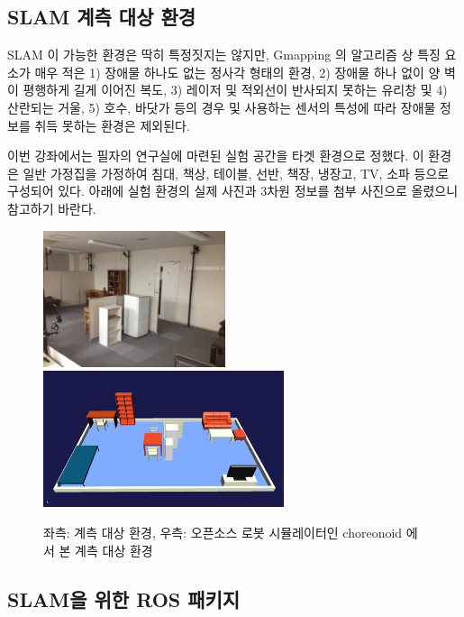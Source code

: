 \subsection{SLAM 계측 대상 환경}
\label{subsubsec:kobuki_target_environment}

SLAM 이 가능한 환경은 딱히 특정짓지는 않지만, Gmapping 의 알고리즘 상 특징 요소가 매우 적은 1) 장애물 하나도 없는 정사각 형태의 환경, 2) 장애물 하나 없이 양 벽이 평행하게 길게 이어진 복도, 3) 레이저 및 적외선이 반사되지 못하는 유리창 및 4) 산란되는 거울, 5) 호수, 바닷가 등의 경우 및 사용하는 센서의 특성에 따라 장애물 정보를 취득 못하는 환경은 제외된다.

이번 강좌에서는 필자의 연구실에 마련된 실험 공간을 타겟 환경으로 정했다. 이 환경은 일반 가정집을 가정하여 침대, 책상, 테이블, 선반, 책장, 냉장고, TV, 소파 등으로 구성되어 있다. 아래에 실험 환경의 실제 사진과 3차원 정보를 첨부 사진으로 올렸으니 참고하기 바란다. 

\begin{figure}[h]
\centering
\includegraphics[height=40mm]{pictures/chapter11/room.jpg}
\includegraphics[height=40mm]{pictures/chapter11/room_choreonoid.png}
\caption{좌측: 계측 대상 환경, 우측: 오픈소스 로봇 시뮬레이터인 choreonoid 에서 본 계측 대상 환경}
\end{figure}

\subsection{SLAM을 위한 ROS 패키지}

